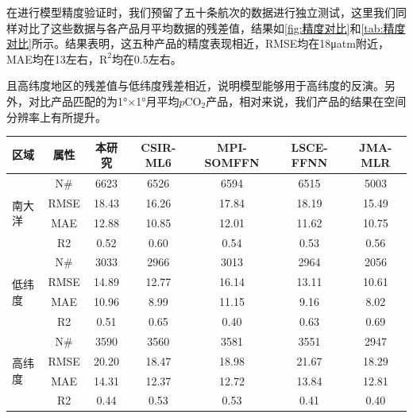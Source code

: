 在进行模型精度验证时，我们预留了五十条航次的数据进行独立测试，这里我们同样对比了这些数据与各产品月平均数据的残差值，结果如\autoref{fig:精度对比}和\autoref{tab:精度对比}所示。结果表明，这五种产品的精度表现相近，RMSE均在18μatm附近，MAE均在13左右，$\mathrm{R^2}$均在0.5左右。

且高纬度地区的残差值与低纬度残差相近，说明模型能够用于高纬度的反演。另外，对比产品匹配的为1°×1°月平均$p\mathrm{CO_2}$产品，相对来说，我们产品的结果在空间分辨率上有所提升。

\begin{table}[htbp]
\centering
{}
\begin{tabularx}{\textwidth}{@{}lcccccc@{}}
\toprule
区域                      & 属性               & 本研究   & CSIR-ML6 & MPI-SOMFFN & LSCE-FFNN & JMA-MLR \\ \midrule
\multirow{4}{*}{南大洋}    & N\#              & 6623  & 6526     & 6594       & 6515      & 5003    \\
                        & RMSE  & 18.43 & 16.26    & 17.84      & 18.19     & 15.49   \\
                        & MAE              & 12.88 & 10.85    & 12.01      & 11.62     & 10.75   \\
                        & R2               & 0.52  & 0.60     & 0.54       & 0.53      & 0.56    \\ \midrule
\multirow{4}{*}{低纬度} & N\#              & 3033  & 2966     & 3013       & 2964      & 2056    \\
                        & RMSE  & 14.89 & 12.77    & 16.14      & 13.11     & 10.61   \\
                        & MAE              & 10.96 & 8.99     & 11.15      & 9.16      & 8.02    \\
                        & R2               & 0.51  & 0.65     & 0.40       & 0.63      & 0.69    \\  \midrule
\multirow{4}{*}{高纬度} & N\#              & 3590  & 3560     & 3581       & 3551      & 2947    \\ 
                        & RMSE  & 20.20 & 18.47    & 18.98      & 21.67     & 18.29   \\
                        & MAE              & 14.31 & 12.37    & 12.72      & 13.84     & 12.81   \\
                        & R2               & 0.44  & 0.53     & 0.53       & 0.41      & 0.40    \\ \bottomrule 
\end{tabularx}
\end{table}

